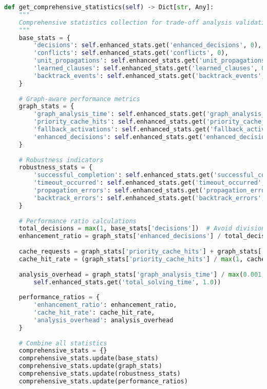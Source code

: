 \begin{lstlisting}[language=Python, caption=Comprehensive Performance Monitoring Infrastructure]
def get_comprehensive_statistics(self) -> Dict[str, Any]:
    """
    Comprehensive statistics collection for trade-off analysis validation.
    """
    base_stats = {
        'decisions': self.enhanced_stats.get('enhanced_decisions', 0),
        'conflicts': self.enhanced_stats.get('conflicts', 0),
        'unit_propagations': self.enhanced_stats.get('unit_propagations', 0),
        'learned_clauses': self.enhanced_stats.get('learned_clauses', 0),
        'backtrack_events': self.enhanced_stats.get('backtrack_events', 0)
    }
    
    # Graph-aware performance metrics
    graph_stats = {
        'graph_analysis_time': self.enhanced_stats.get('graph_analysis_time', 0.0),
        'priority_cache_hits': self.enhanced_stats.get('priority_cache_hits', 0),
        'fallback_activations': self.enhanced_stats.get('fallback_activations', 0),
        'enhanced_decisions': self.enhanced_stats.get('enhanced_decisions', 0)
    }
    
    # Robustness indicators
    robustness_stats = {
        'successful_completion': self.enhanced_stats.get('successful_completion', False),
        'timeout_occurred': self.enhanced_stats.get('timeout_occurred', False),
        'propagation_errors': self.enhanced_stats.get('propagation_errors', 0),
        'backtrack_errors': self.enhanced_stats.get('backtrack_errors', 0)
    }
    
    # Performance ratio calculations
    total_decisions = max(1, base_stats['decisions'])  # Avoid division by zero
    enhancement_ratio = graph_stats['enhanced_decisions'] / total_decisions
    
    cache_requests = graph_stats['priority_cache_hits'] + graph_stats['fallback_activations']
    cache_hit_rate = (graph_stats['priority_cache_hits'] / max(1, cache_requests))
    
    analysis_overhead = graph_stats['graph_analysis_time'] / max(0.001, 
        self.enhanced_stats.get('total_solving_time', 1.0))
    
    performance_ratios = {
        'enhancement_ratio': enhancement_ratio,
        'cache_hit_rate': cache_hit_rate,
        'analysis_overhead': analysis_overhead
    }
    
    # Combine all statistics
    comprehensive_stats = {}
    comprehensive_stats.update(base_stats)
    comprehensive_stats.update(graph_stats)
    comprehensive_stats.update(robustness_stats)
    comprehensive_stats.update(performance_ratios)
    

\end{lstlisting}
